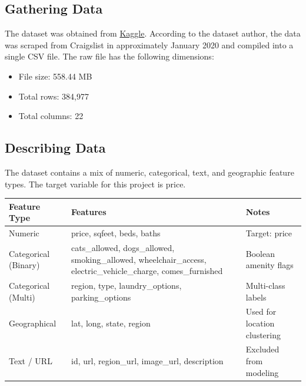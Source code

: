 

\setcounter{section}{2}



\subsection{Gathering Data}
\label{subsec:Gathering Data}
\noindent
The dataset was obtained from \href{https://www.kaggle.com/datasets/austinreese/usa-housing-listings}{Kaggle}. According to the dataset author, the data was scraped from Craigslist in approximately January 2020 and compiled into a single CSV file. The raw file has the following dimensions:
\vspace{-12pt}
\begin{itemize} [itemsep = -12pt]
    \item File size: 558.44 MB
    \item Total rows: 384,977
    \item Total columns: 22
\end{itemize}


\subsection{Describing Data}
\noindent
The dataset contains a mix of numeric, categorical, text, and geographic feature types. The target variable for this project is price.

\begin{table}
    \centering
    \begin{tabular}{||p{2.2cm}|p{8cm}|p{4.7cm}||}
    \hline
    \hline
        Feature Type & Features & Notes \\
        \hline
        \hline
        Numeric & price, sqfeet, beds, baths & Target: price \\
        \hline
        Categorical (Binary) & cats\_allowed, dogs\_allowed, smoking\_allowed, wheelchair\_access, electric\_vehicle\_charge, comes\_furnished & Boolean amenity flags \\
        \hline
        Categorical (Multi) & region, type, laundry\_options, parking\_options & Multi-class labels \\
        \hline
        Geographical & lat, long, state, region & Used for location clustering \\
        \hline
        Text / URL & id, url, region\_url, image\_url, description & Excluded from modeling \\
        \hline
        \hline
    \end{tabular}
\end{table}

